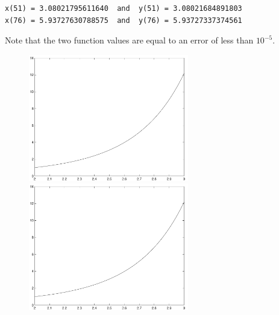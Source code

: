 \documentclass{ximera}
\begin{document}
\begin{computerExercise}
\begin{solution}
\begin{verbatim}
x(51) = 3.08021795611640  and  y(51) = 3.08021684891803
x(76) = 5.93727630788575  and  y(76) = 5.93727337374561
\end{verbatim}
Note that the two function values are equal to an error of less than 
$10^{-5}$.

\begin{figure}[htb]
     \centerline{%
     \includegraphics[width=2.75in]{exfigure/fig3_8a.pdf}
     \includegraphics[width=2.75in]{exfigure/fig3_8b.pdf}}
\end{figure} 


\end{solution}
\end{computerExercise}
\end{document}
